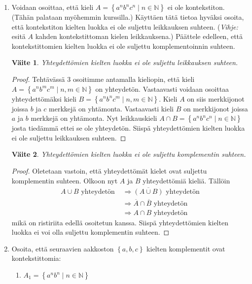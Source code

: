 \documentclass[a4paper,11pt]{article}
\newtheorem*{claim}{Väite}
\newcommand{\set}[1]{{\left\{ #1 \right\}}}
\newcommand{\Nat}{\mathbb{N}}
\begin{document}
\begin{enumerate}
\item
  Voidaan osoittaa, että kieli $A=\set{ a^n b^n c^n\mid n \in \Nat}$ ei
  ole kontekstiton. (Tähän palataan myöhemmin kurssilla.) Käyttäen
  tätä tietoa hyväksi osoita, että kontekstiton kielten luokka ei ole
  suljettu leikkauksen suhteen. ({\em Vihje:} esitä $A$ kahden
  kontekstittoman kielen leikkauksena.) Päättele edelleen, että
  kontekstittomien kielten luokka ei ole suljettu komplementoinnin
  suhteen.
  \begin{claim}
    Yhteydettömien kielten luokka ei ole suljettu leikkauksen suhteen.
  \end{claim}
  \begin{proof}
    Tehtävässä 3 osoitimme antamalla kieliopin, että kieli $A =
    \set{a^nb^mc^m \mid n,m \in \Nat}$ on yhteydetön. Vastaavasti
    voidaan osoittaa yhteydettömäksi kieli $B = \set{a^nb^nc^m \mid
      n,m \in \Nat}$. Kieli $A$ on siis merkkijonot joissa $b$ ja $c$
    merkkejä on yhtämonta. Vastaavasti kieli $B$ on merkkijonot joissa
    $a$ ja $b$ merkkejä on yhtämonta. Nyt leikkauskieli $A \cap B =
    \set{a^nb^nc^n \mid n \in \Nat}$ josta tiedämmä ettei se ole
    yhteydetön. Siispä yhteydettömien kielten luokka ei ole suljettu
    leikkauksen suhteen.
  \end{proof}
  \begin{claim}
    Yhteydettömien kielten luokka ei ole suljettu komplementin suhteen.
  \end{claim}
  \begin{proof}
    Oletetaan vastoin, että yhteydettömät kielet ovat suljettu
    komplementin suhteen. Olkoon nyt $A$ ja $B$ yhteydettömiä kieliä.
    Tällöin
    \begin{align*}
      A \cup B \text{ yhteydetön }
      & \Rightarrow \overline{(A \cup B)} \text{ yhteydetön} \\
      & \Rightarrow \overline{A} \cap \overline{B} \text{ yhteydetön} \\
      & \Rightarrow A \cap B \text{ yhteydetön}
    \end{align*}
    mikä on ristiriita edellä osoitetun kanssa. Siispä yhteydettömien
    kielten luokka ei voi olla suljettu komplementin suhteen.
  \end{proof}

\item
  Osoita, että seuraavien aakkoston $\set{a,b,c}$ kielten komplementit
  ovat kontekstittomia:
%
  \begin{enumerate}
  \item
    $A_1=\set{a^n b^n \mid n \in \Nat}$


\end{enumerate}
\end{enumerate}
\end{document}
